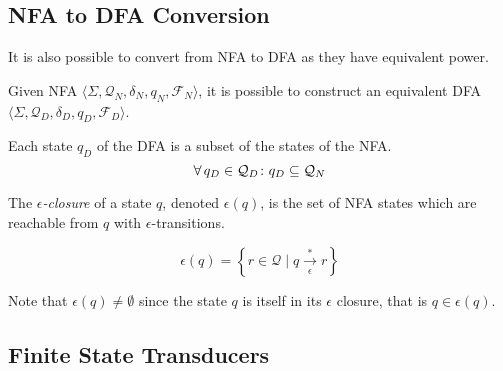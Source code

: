\subsection{NFA to DFA Conversion}

It is also possible to convert from NFA to DFA as they have equivalent power.

\begin{definition}
    Given NFA $\langle \Sigma, \mathcal{Q}_N, \delta_N, q_N, \mathcal{F}_N \rangle$, it is possible to construct an equivalent DFA $\langle \Sigma, \mathcal{Q}_D, \delta_D, q_D, \mathcal{F}_D \rangle$.
    
    Each state $q_D$ of the DFA is a subset of the states of the NFA.
    \begin{equation}
        \operatorname{\forall} q_D \in \mathcal{Q}_D \colon q_D \subseteq \mathcal{Q}_N
    \end{equation}
\end{definition}

\begin{definition}
    The \textit{$\epsilon$-closure} of a state $q$, denoted $\epsilon(q)$, is the set of NFA states which are reachable from $q$ with $\epsilon$-transitions.
    
    \begin{equation}
        \epsilon(q) = \left\lbrace r \in \mathcal{Q} \mid q \xrightarrow[\epsilon]{\ast} r \right\rbrace
    \end{equation}
    
    Note that $\epsilon(q) \ne \emptyset$ since the state $q$ is itself in its $\epsilon$ closure, that is $q \in \epsilon(q)$.
\end{definition}


\subsection{Finite State Transducers}

